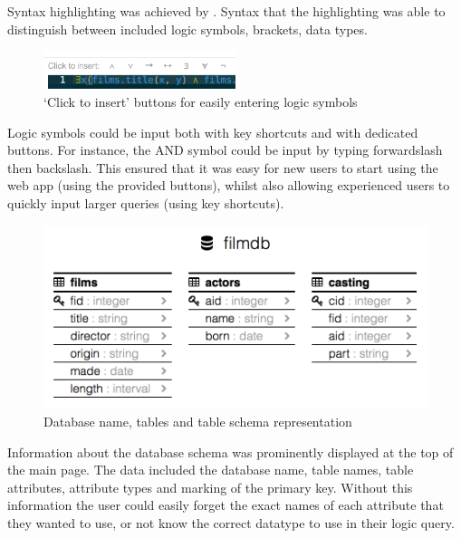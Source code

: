 \documentclass[a4paper, 11pt]{article}
\begin{document}
      Syntax highlighting was achieved by . Syntax that the
      highlighting was able to distinguish between included logic symbols,
      brackets, data types.

      \begin{figure}[h!]
        \centering
        \includegraphics[width=0.5\textwidth]{images/site_click_to_insert.png}
        \caption{`Click to insert' buttons for easily entering logic symbols}
      \end{figure}

      Logic symbols could be input both with key shortcuts and with dedicated
      buttons. For instance, the AND symbol could be input by typing
      forwardslash then backslash. This ensured that it was easy for new users
      to start using the web app (using the provided buttons), whilst also
      allowing experienced users to quickly input larger queries (using key
      shortcuts).

      \begin{figure}[h!]
        \centering
        \includegraphics[width=\textwidth]{images/site_schema.png}
        \caption{Database name, tables and table schema representation}
      \end{figure}

      Information about the database schema was prominently displayed at the top
      of the main page. The data included the database name, table names, table
      attributes, attribute types and marking of the primary key. Without this
      information the user could easily forget the exact names of each attribute
      that they wanted to use, or not know the correct datatype to use in their
      logic query.
\end{document}
